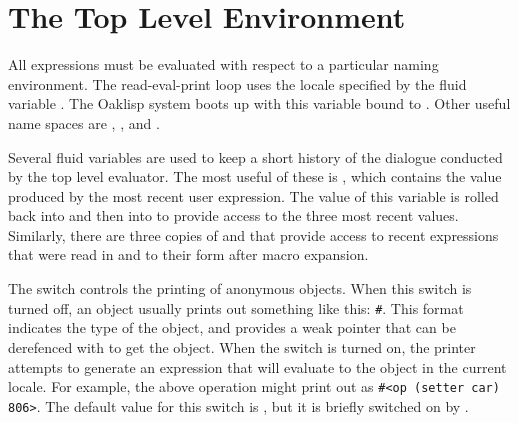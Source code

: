 




\section{The Top Level Environment}

All expressions must be evaluated with respect to a particular naming
environment.  The read-eval-print loop uses the locale specified by
the fluid variable .  The Oaklisp system boots up
with this variable bound to .  Other useful name
spaces are , , and
.

Several fluid variables are used to keep a short history of the
dialogue conducted by the top level evaluator.  The most useful of
these is \dffl{*}, which contains the value produced by the most
recent user expression.  The value of this variable is rolled back
into \dffl{**} and then into \dffl{***} to provide access to the three
most recent values.  Similarly, there are three copies of \dffl{+} and
 that provide access to recent expressions that were read in
and to their form after macro expansion.

The switch  controls the printing of anonymous
objects.  When this switch is turned off, an object usually prints out
something like this: \texttt{\#<op 806>}.  This format indicates the type
of the object, and provides a weak pointer that can be derefenced with
 to get the object.  When the
 switch is turned on, the printer attempts to
generate an expression that will evaluate to the object in the current
locale.  For example, the above operation might print out as \texttt{\#<op
(setter car) 806>}.  The default value for this switch is
, but it is briefly switched on by .

